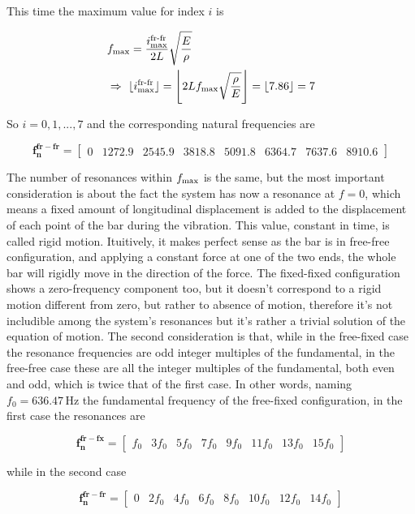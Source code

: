 \documentclass[a4paper,12pt,oneside]{article}
\begin{document}
This time the maximum value for index $ i $ is

\[ \begin{split}
	& f_\textup{max} = \frac{i^\textup{fr-fr}_\textup{max}}{2L}
		\sqrt{\frac{E}{\rho}} \\
	& \Rightarrow ~ \lfloor i^\textup{fr-fr}_\textup{max} \rfloor =
		\Biggl\lfloor 2 L f_\textup{max} \sqrt{\frac{\rho}{E}} \Biggr\rfloor =
		\lfloor 7.86 \rfloor = 7
\end{split} \]

So $ i = 0,1,...,7 $ and the corresponding natural frequencies are

\[
	\mathbf{f_n^{fr-fr}} =	\begin{bmatrix}
																	0					& 1272.9	& 2545.9	& 3818.8
																	& 5091.8	& 6364.7	& 7637.6	& 8910.6
													\end{bmatrix}
\]

The number of resonances within $ f_\textup{max} $ is the same, but the most important consideration is about the fact the system has now a resonance at $ f = 0 $, which means a fixed amount of longitudinal displacement is added to the displacement of each point of the bar during the vibration. This value, constant in time, is called rigid motion. Ituitively, it makes perfect sense as the bar is in free-free configuration, and applying a constant force at one of the two ends, the whole bar will rigidly move in the direction of the force. The fixed-fixed configuration shows a zero-frequency component too, but it doesn't correspond to a rigid motion different from zero, but rather to absence of motion, therefore it's not includible among the system's resonances but it's rather a trivial solution of the equation of motion. The second consideration is that, while in the free-fixed case the resonance frequencies are odd integer multiples of the fundamental, in the free-free case these are all the integer multiples of the fundamental, both even and odd, which is twice that of the first case. In other words, naming $ f_0 = 636.47 \, \text{Hz} $ the fundamental frequency of the free-fixed configuration, in the first case the resonances are

\[
	\mathbf{f_n^{fr-fx}} =	\begin{bmatrix}
														f_0	& 3f_0	& 5f_0	& 7f_0	& 9f_0	& 11f_0	& 13f_0	& 15f_0
													\end{bmatrix}
\]

while in the second case

\[
	\mathbf{f_n^{fr-fr}} =	\begin{bmatrix}
														0	& 2f_0	& 4f_0	& 6f_0	& 8f_0	& 10f_0	& 12f_0	& 14f_0
													\end{bmatrix}
\]
\end{document}
